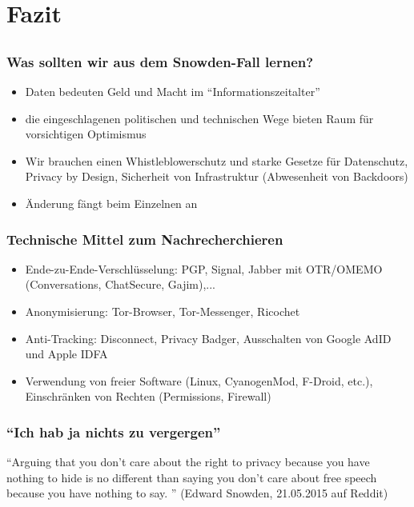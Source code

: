 \documentclass[12pt, xcolor={svgnames,table}]{beamer}
\begin{document}
\section{Fazit}
\subsection{}

\begin{frame}
    \frametitle{Was sollten wir aus dem Snowden-Fall lernen?}
    \footnotesize
    \begin{itemize}
      \item Daten bedeuten Geld und Macht im ``Informationszeitalter''
      \item die eingeschlagenen politischen und technischen Wege bieten Raum für vorsichtigen Optimismus
      \item Wir brauchen einen Whistleblowerschutz und starke Gesetze für Datenschutz, Privacy by Design, Sicherheit von Infrastruktur (Abwesenheit von Backdoors)
      \item Änderung fängt beim Einzelnen an
    \end{itemize}
\end{frame}

\begin{frame}
    \frametitle{Technische Mittel zum Nachrecherchieren}
    \footnotesize
    \begin{itemize}
      \item Ende-zu-Ende-Verschlüsselung: PGP, Signal, Jabber mit OTR/OMEMO (Conversations, ChatSecure, Gajim),...
      \item Anonymisierung: Tor-Browser, Tor-Messenger, Ricochet
      \item Anti-Tracking: Disconnect, Privacy Badger, Ausschalten von Google AdID und Apple IDFA
      \item Verwendung von freier Software (Linux, CyanogenMod, F-Droid, etc.), Einschränken von Rechten (Permissions, Firewall)
    \end{itemize}
\end{frame}

\begin{frame}
    \frametitle{``Ich hab ja nichts zu vergergen''}
    \begin{center}
      ``Arguing that you don't care about the right to privacy because you have nothing to hide is no different than saying you don't care about free speech because you have nothing to say. ''
      (Edward Snowden, 21.05.2015 auf Reddit)
    \end{center}
\end{frame}
\end{document}
